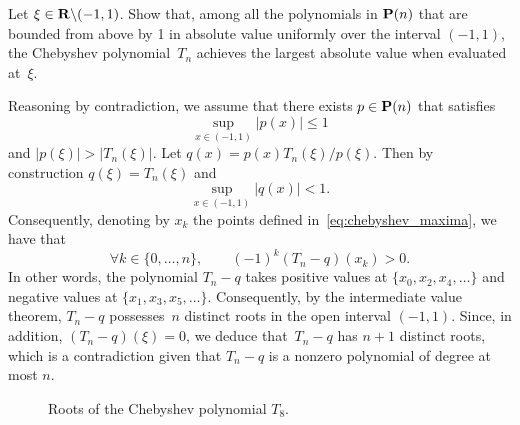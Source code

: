 \begin{exercise}
    \label{exercise:auxiliary_chebyshev}
    Let $\xi \in \mathbf R \backslash (-1, 1)$.
    Show that, among all the polynomials in $\mathbf P(n)$ that are bounded from above by 1 in absolute value uniformly over the interval $(-1, 1)$,
    the Chebyshev polynomial~$T_n$ achieves the largest absolute value when evaluated at~$\xi$.
\end{exercise}
\begin{solution}
    Reasoning by contradiction,
    we assume that there exists $p \in \mathbf P(n)$ that satisfies
    \[
        \sup_{x \in (-1, 1)} \lvert p(x) \rvert \leq 1
    \]
    and $\lvert p(\xi) \rvert > \lvert T_n(\xi) \rvert$.
    Let $q(x) = p(x) T_n(\xi) / p(\xi)$.
    Then by construction $q(\xi) = T_n(\xi)$
    and
    \[
       \sup_{x \in (-1, 1)} \lvert q(x) \rvert < 1.
    \]
    Consequently, denoting by $x_k$ the points defined in~\eqref{eq:chebyshev_maxima},
    we have that
    \[
        \forall k \in \{0, \dotsc, n\}, \qquad
        (-1)^k (T_n - q)(x_k) > 0.
    \]
    In other words, the polynomial $T_n - q$ takes positive values at $\{x_0, x_2, x_4, \dotsc\}$ and negative values at $\{x_1, x_3, x_5, \dotsc\}$.
    Consequently, by the intermediate value theorem,
    $T_n - q$ possesses~$n$ distinct roots in the open interval $(-1, 1)$.
    Since, in addition, $(T_n - q)(\xi) = 0$,
    we deduce that~$T_n - q$ has $n+1$ distinct roots,
    which is a contradiction given that $T_n - q$ is a nonzero polynomial of degree at most $n$.
\end{solution}

\begin{figure}
    \centering
    \caption{Roots of the Chebyshev polynomial $T_8$.}
    \label{fig:chebyshev_roots}
\end{figure}

